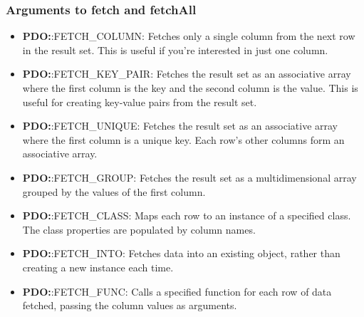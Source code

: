 \documentclass{report}
\begin{document}
    \bigbreak \noindent 
    \subsubsection{Arguments to fetch and fetchAll}
    \bigbreak \noindent 
    \begin{itemize}
        \item \textbf{PDO:}:FETCH\_COLUMN: Fetches only a single column from the next row in the result set. This is useful if you’re interested in just one column.
        \item \textbf{PDO:}:FETCH\_KEY\_PAIR: Fetches the result set as an associative array where the first column is the key and the second column is the value. This is useful for creating key-value pairs from the result set.
        \item \textbf{PDO:}:FETCH\_UNIQUE: Fetches the result set as an associative array where the first column is a unique key. Each row's other columns form an associative array.
        \item \textbf{PDO:}:FETCH\_GROUP: Fetches the result set as a multidimensional array grouped by the values of the first column.
        \item \textbf{PDO:}:FETCH\_CLASS: Maps each row to an instance of a specified class. The class properties are populated by column names.
        \item \textbf{PDO:}:FETCH\_INTO: Fetches data into an existing object, rather than creating a new instance each time.
        \item \textbf{PDO:}:FETCH\_FUNC: Calls a specified function for each row of data fetched, passing the column values as arguments.
    \end{itemize}



    \pagebreak 
\end{document}
